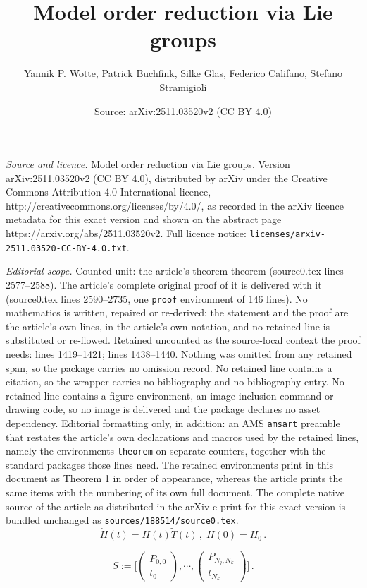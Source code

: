\documentclass[10pt,a4paper]{amsart}
\title{Model order reduction via Lie groups}
\author{Yannik P. Wotte, Patrick Buchfink, Silke Glas, Federico Califano, Stefano Stramigioli}
\date{Source: arXiv:2511.03520v2 (CC BY 4.0)}
\newcommand{\pmat}[1]{\begin{pmatrix}#1\end{pmatrix}}
\begin{document}
\maketitle

\noindent\emph{Source and licence.} Model order reduction via Lie groups. Version arXiv:2511.03520v2 (CC BY 4.0), distributed by arXiv under the Creative Commons Attribution 4.0 International licence, http://creativecommons.org/licenses/by/4.0/, as recorded in the arXiv licence metadata for this exact version and shown on the abstract page https://arxiv.org/abs/2511.03520v2. Full licence notice: \texttt{licenses/arxiv-2511.03520-CC-BY-4.0.txt}.\par\smallskip

\noindent\textit{Editorial scope.} Counted unit: the article's theorem theorem (source0.tex lines 2577--2588). The article's complete original proof of it is delivered with it (source0.tex lines 2590--2735, one \texttt{proof} environment of 146 lines). No mathematics is written, repaired or re-derived: the statement and the proof are the article's own lines, in the article's own notation, and no retained line is substituted or re-flowed.  Retained uncounted as the source-local context the proof needs: lines 1419--1421; lines 1438--1440.  Nothing was omitted from any retained span, so the package carries no omission record.  No retained line contains a citation, so the wrapper carries no bibliography and no bibliography entry.  No retained line contains a figure environment, an image-inclusion command or drawing code, so no image is delivered and the package declares no asset dependency.  Editorial formatting only, in addition: an AMS \texttt{amsart} preamble that restates the article's own declarations and macros used by the retained lines, namely the environments \texttt{theorem} on separate counters, together with the standard packages those lines need.  The retained environments print in this document as Theorem 1 in order of appearance, whereas the article prints the same items with the numbering of its own full document.  The complete native source of the article as distributed in the arXiv e-print for this exact version is bundled unchanged as \texttt{sources/188514/source0.tex}.
\begin{equation}\label{eq:rigid-group-dynamics}
    \dot{H}(t) = H(t)\widetilde{T}(t)\,,\; H(0) = H_0\,.
\end{equation}

\begin{equation}\label{eq:snapshots-rigid-pointcloud}
    S := \bigg[\pmat{P_{0,0} \\ t_0}, \cdots, \pmat{P_{N_j,N_k}\\ t_{N_k}}\bigg] \,.
\end{equation}  
\end{document}

